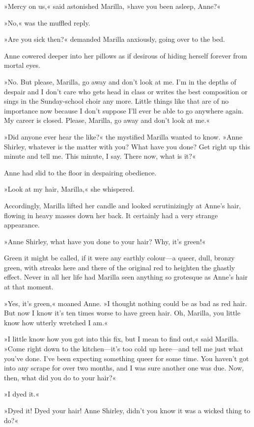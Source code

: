 »Mercy on us,« said astonished Marilla, »have you been asleep, Anne?«

»No,« was the muffled reply.

»Are you sick then?« demanded Marilla anxiously, going over to the bed.

Anne cowered deeper into her pillows as if desirous of hiding herself forever from mortal eyes.

»No. But please, Marilla, go away and don’t look at me. I’m in the depths of despair and I don’t care who gets head in class or writes the best composition or sings in the Sunday-school choir any more. Little things like that are of no importance now because I don’t suppose I’ll ever be able to go anywhere again. My career is closed. Please, Marilla, go away and don’t look at me.«

»Did anyone ever hear the like?« the mystified Marilla wanted to know. »Anne Shirley, whatever is the matter with you? What have you done? Get right up this minute and tell me. This minute, I say. There now, what is it?«

Anne had slid to the floor in despairing obedience.

»Look at my hair, Marilla,« she whispered.

Accordingly, Marilla lifted her candle and looked scrutinizingly at Anne’s hair, flowing in heavy masses down her back. It certainly had a very strange appearance.

»Anne Shirley, what have you done to your hair? Why, it’s green!«

Green it might be called, if it were any earthly colour—a queer, dull, bronzy green, with streaks here and there of the original red to heighten the ghastly effect. Never in all her life had Marilla seen anything so grotesque as Anne’s hair at that moment.

»Yes, it’s green,« moaned Anne. »I thought nothing could be as bad as red hair. But now I know it’s ten times worse to have green hair. Oh, Marilla, you little know how utterly wretched I am.«

»I little know how you got into this fix, but I mean to find out,« said Marilla. »Come right down to the kitchen—it’s too cold up here—and tell me just what you’ve done. I’ve been expecting something queer for some time. You haven’t got into any scrape for over two months, and I was sure another one was due. Now, then, what did you do to your hair?«

»I dyed it.«

»Dyed it! Dyed your hair! Anne Shirley, didn’t you know it was a wicked thing to do?«

